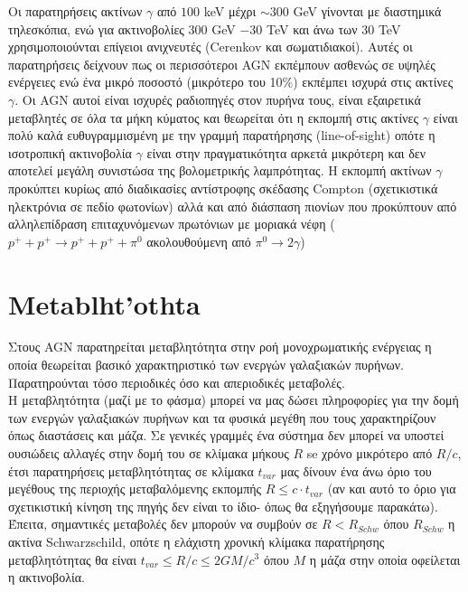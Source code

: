 Οι παρατηρήσεις ακτίνων $\gamma$ από $100$ \textlatin{keV} μέχρι $\sim 300$ \textlatin{GeV} γίνονται με διαστημικά τηλεσκόπια, ενώ για ακτινοβολίες $300$ \textlatin{GeV} $- 30$ \textlatin{TeV} και άνω των $30$ \textlatin{TeV} χρησιμοποιούνται επίγειοι ανιχνευτές (\textlatin{Cerenkov} και σωματιδιακοί). Αυτές οι παρατηρήσεις δείχνουν πως οι περισσότεροι \textlatin{AGN} εκπέμπουν ασθενώς σε υψηλές ενέργειες ενώ ένα μικρό ποσοστό (μικρότερο του 10\%) εκπέμπει ισχυρά στις ακτίνες $\gamma$. Οι \textlatin{AGN} αυτοί είναι ισχυρές ραδιοπηγές στον πυρήνα τους, είναι εξαιρετικά μεταβλητές σε όλα τα μήκη κύματος και θεωρείται ότι η εκπομπή στις ακτίνες $\gamma$ είναι πολύ καλά ευθυγραμμισμένη με την γραμμή παρατήρησης (\textlatin{line-of-sight)} οπότε η ισοτροπική ακτινοβολία $\gamma$ είναι στην πραγματικότητα αρκετά μικρότερη και δεν αποτελεί μεγάλη συνιστώσα της βολομετρικής λαμπρότητας\cite{netzer_2013}. Η εκπομπή ακτίνων $\gamma$ προκύπτει κυρίως από διαδικασίες αντίστροφης σκέδασης \textlatin{Compton} (σχετικιστικά ηλεκτρόνια σε πεδίο φωτονίων) αλλά και από διάσπαση πιονίων που προκύπτουν από αλληλεπίδραση επιταχυνόμενων πρωτόνιων με μοριακά νέφη ($ p^{+} + p^{+} \longrightarrow p^{+} + p^{+} + {\pi}^0 $ ακολουθούμενη από ${\pi}^0 \longrightarrow 2 \gamma $)

\section{Metablht'othta}

Στους \textlatin{AGN} παρατηρείται μεταβλητότητα στην ροή μονοχρωματικής ενέργειας η οποία θεωρείται βασικό χαρακτηριστικό των ενεργών γαλαξιακών πυρήνων. Παρατηρούνται τόσο περιοδικές όσο και απεριοδικές μεταβολές.\\
Η μεταβλητότητα (μαζί με το φάσμα) μπορεί να μας δώσει πληροφορίες για την δομή των ενεργών γαλαξιακών πυρήνων και τα φυσικά μεγέθη που τους χαρακτηρίζουν όπως διαστάσεις και μάζα. Σε γενικές γραμμές ένα σύστημα δεν μπορεί να υποστεί ουσιώδεις αλλαγές στην δομή του σε κλίμακα μήκους $R$ se χρόνο μικρότερο από $R/c$, έτσι παρατηρήσεις μεταβλητότητας σε κλίμακα $t_{var}$ μας δίνουν ένα άνω όριο του μεγέθους της περιοχής μεταβαλόμενης εκπομπής $R \leq c\cdot t_{var}$ (αν και αυτό το όριο για σχετικιστική κίνηση της πηγής δεν είναι το ίδιο- όπως θα εξηγήσουμε παρακάτω). Έπειτα, σημαντικές μεταβολές δεν μπορούν να συμβούν σε $R<R_{Schw}$ όπου $R_{Schw}$ η ακτίνα \textlatin{Schwarzschild}, οπότε η ελάχιστη χρονική κλίμακα παρατήρησης μεταβλητότητας θα είναι $t_{var} \leq R/c \leq 2GM/c^3$ όπου $Μ$ η μάζα στην οποία οφείλεται η ακτινοβολία\cite{AccrPower}.

